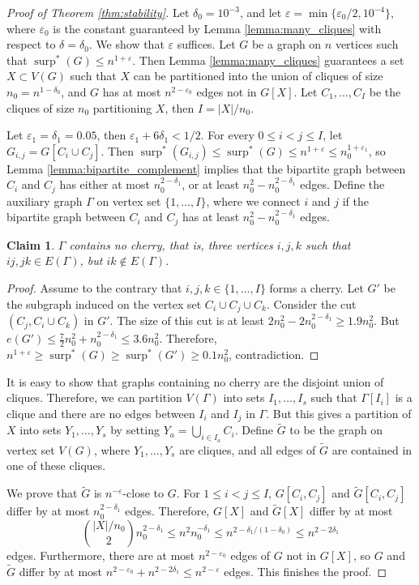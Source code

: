 \documentclass[11pt]{article}
\theoremstyle{plain}
\newtheorem{claim}[theorem]{Claim}
\theoremstyle{definition}
\DeclareMathOperator{\surp}{surp}
\newcommand{\eps}{\varepsilon}
\begin{document}
\begin{proof}[Proof of Theorem \ref{thm:stability}]
Let $\delta_0=10^{-3}$, and let $\eps=\min\{\eps_0/2,10^{-4}\}$, where $\eps_0$ is the constant guaranteed by Lemma \ref{lemma:many_cliques} with respect to $\delta=\delta_0$. We show that $\eps$ suffices. Let $G$ be a graph on $n$ vertices such that $\surp^{*}(G)\leq n^{1+\eps}$. Then Lemma \ref{lemma:many_cliques} guarantees a set $X\subset V(G)$ such that $X$ can be partitioned into the union of cliques of size $n_0=n^{1-\delta_0}$, and $G$ has at most $n^{2-\eps_0}$ edges not in $G[X]$. Let $C_1,\dots,C_I$ be the cliques of size $n_0$ partitioning $X$, then $I=|X|/n_0$. 

Let $\eps_1=\delta_1=0.05$, then $\eps_1+6\delta_1<1/2$. For every $0\leq i<j\leq I$, let $G_{i,j}=G[C_i\cup C_j]$. Then $\surp^*(G_{i,j})\leq \surp^*(G)\leq n^{1+\eps}\leq n_0^{1+\eps_1}$, so Lemma \ref{lemma:bipartite_complement} implies that the bipartite graph between $C_i$ and $C_j$ has either at most $n_0^{2-\delta_1}$, or at least $n_0^2-n_0^{2-\delta_1}$ edges. Define the auxiliary graph $\Gamma$ on vertex set $\{1,\dots,I\}$, where we connect $i$ and $j$ if the bipartite graph between $C_i$ and $C_j$ has at least $n_0^2-n_0^{2-\delta_1}$ edges.

\begin{claim}
$\Gamma$ contains no cherry, that is, three vertices $i,j,k$ such that $ij,jk\in E(\Gamma)$, but $ik\not\in E(\Gamma)$.
\end{claim}

\begin{proof}
Assume to the contrary that $i,j,k\in \{1,\dots,I\}$ forms a cherry. Let $G'$ be the subgraph induced on the vertex set $C_i\cup C_j\cup C_k$. Consider the cut $(C_j,C_i\cup C_k)$ in $G'$. The size of this cut is at least $2n_0^2-2n_0^{2-\delta_1}\geq 1.9n_0^2$. But $e(G')\leq \frac{7}{2}n_0^{2}+n_0^{2-\delta_1}\leq 3.6n_0^2$. Therefore, $n^{1+\eps}\geq \surp^*(G)\geq \surp^*(G')\geq 0.1n_0^2$, contradiction. 
\end{proof}

It is easy to show that graphs containing no cherry are the disjoint union of cliques. Therefore, we can partition $V(\Gamma)$ into sets $I_1,\dots,I_s$ such that $\Gamma[I_i]$ is a clique and there are no edges between $I_i$ and $I_j$ in $\Gamma$. But this gives a partition of $X$ into sets $Y_1,\dots,Y_s$ by setting $Y_a=\bigcup_{i\in I_a}C_i$. Define $\widetilde{G}$ to be the graph on vertex set $V(G)$, where $Y_1,\dots,Y_s$ are cliques, and all edges of $\widetilde{G}$ are contained in one of these cliques.

We prove that $\widetilde{G}$ is $n^{-\eps}$-close to $G$. For $1\leq i<j\leq I$, $G[C_i,C_j]$ and $\widetilde{G}[C_i,C_j]$ differ by at most $n_0^{2-\delta_1}$ edges. Therefore, $G[X]$ and $\widetilde{G}[X]$ differ by at most $$\binom{|X|/n_0}{2}n_0^{2-\delta_1}\leq n^2 n_0^{-\delta_1}\leq n^{2-\delta_1/(1-\delta_0)}\leq n^{2-2\delta_1}$$
edges. Furthermore, there are at most $n^{2-\eps_0}$ edges of $G$ not in $G[X]$, so $G$ and $\widetilde{G}$ differ by at most $n^{2-\eps_0}+n^{2-2\delta_1}\leq n^{2-\eps}$ edges. This finishes the proof.
\end{proof}
\end{document}
